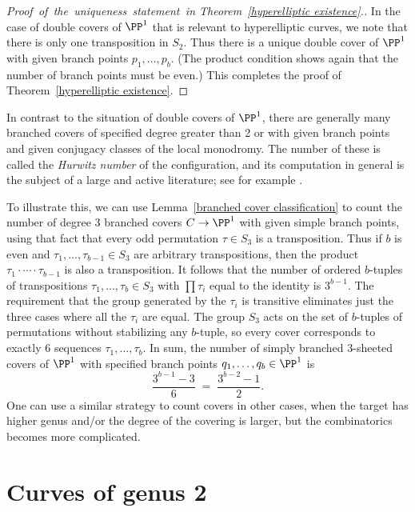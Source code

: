 \begingroup \def\,{\kern1pt}
\begin{proof}[Proof \,of \,the \,uniqueness \,statement \,in
Theorem~\ref{hyperelliptic existence}.]
In the case of double covers of $\PP^1$ that is relevant to hyperelliptic curves, we note that
there is only one transposition in $S_2$. Thus there is a unique double
cover of $\PP^1$ with given branch points $p_1,\dots,p_b$. (The product
condition shows again that the number of branch points must be even.) This
completes the proof of Theorem~\ref{hyperelliptic existence}.
\end{proof}
\endgroup

\begin{example}
In contrast to the situation of double covers of $\PP^1$, there are generally many
branched covers of specified degree  greater than 2 or with given branch points
and given conjugacy classes of the local monodromy.
The number of these is called
the \emph{Hurwitz number}
%
of the configuration, and its computation in
general is the subject of a large and active literature; see for example
\cite{ELSV}.

To illustrate this, we can use Lemma~\ref{branched cover classification} to count the number of
degree 3 branched covers
%
$C \to \PP^1$ with given simple branch points, using that fact that every
odd permutation $\tau \in S_3$ is a transposition. Thus if $b$ is even
and  $\tau_1,\dots,\tau_{b-1} \in S_3$ are arbitrary transpositions,
then the product
$\tau_1\cdot \cdots\cdot \tau_{b-1}$ is also a
 transposition. It follows that the number of ordered $b$-tuples of
 transpositions $\tau_1,\dots,\tau_{b} \in S_3$ with $\prod \tau_i$
 equal to the identity is $3^{b-1}$. The requirement that the group
 generated by the $\tau_i$ is transitive eliminates just the three
 cases where all the $\tau_i$ are equal. The group $S_3$ acts on the
 set of $b$-tuples of permutations without stabilizing any $b$-tuple,
 so every cover corresponds to exactly 6 sequences
  $\tau_1,\dots,\tau_b$. In sum, the number of simply branched
  3-sheeted covers of $\PP^1$ with specified branch points
  $q_1,\dots,q_b \in \PP^1$ is
$$
\frac{3^{b-1} - 3}{6} \; = \; \frac{3^{b-2} - 1}{2}.
$$
One can use a similar strategy to count covers in other cases, when the
target has higher genus and/or the degree of the covering is larger,
but the combinatorics becomes more complicated.
\end{example}

\section{Curves of genus 2}
\label{genus 2 section}

